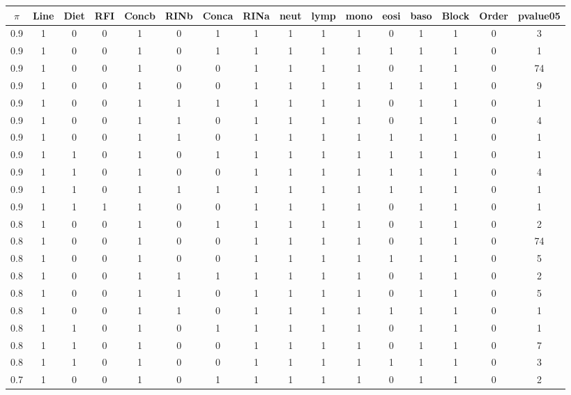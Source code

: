 \documentclass[12pt, letter]{article}\usepackage[]{graphicx}\usepackage[]{color}
\begin{document}
\begin{table}
\centering
{\scriptsize
\begin{tabular}{|c|c|c|c|c|c|c|c|c|c|c|c|c|c|c|c|}
  \hline
$\pi$ & Line & Diet & RFI & Concb & RINb & Conca & RINa & neut & lymp & mono & eosi & baso & Block & Order & pvalue05 \\ 
  \hline
0.9 & 1 & 0 & 0 & 1 & 0 & 1 & 1 & 1 & 1 & 1 & 0 & 1 & 1 & 0 & 3 \\ 
  0.9 & 1 & 0 & 0 & 1 & 0 & 1 & 1 & 1 & 1 & 1 & 1 & 1 & 1 & 0 & 1 \\ 
  0.9 & 1 & 0 & 0 & 1 & 0 & 0 & 1 & 1 & 1 & 1 & 0 & 1 & 1 & 0 & 74 \\ 
  0.9 & 1 & 0 & 0 & 1 & 0 & 0 & 1 & 1 & 1 & 1 & 1 & 1 & 1 & 0 & 9 \\ 
  0.9 & 1 & 0 & 0 & 1 & 1 & 1 & 1 & 1 & 1 & 1 & 0 & 1 & 1 & 0 & 1 \\ 
  0.9 & 1 & 0 & 0 & 1 & 1 & 0 & 1 & 1 & 1 & 1 & 0 & 1 & 1 & 0 & 4 \\ 
  0.9 & 1 & 0 & 0 & 1 & 1 & 0 & 1 & 1 & 1 & 1 & 1 & 1 & 1 & 0 & 1 \\ 
  0.9 & 1 & 1 & 0 & 1 & 0 & 1 & 1 & 1 & 1 & 1 & 1 & 1 & 1 & 0 & 1 \\ 
  0.9 & 1 & 1 & 0 & 1 & 0 & 0 & 1 & 1 & 1 & 1 & 1 & 1 & 1 & 0 & 4 \\ 
  0.9 & 1 & 1 & 0 & 1 & 1 & 1 & 1 & 1 & 1 & 1 & 1 & 1 & 1 & 0 & 1 \\ 
  0.9 & 1 & 1 & 1 & 1 & 0 & 0 & 1 & 1 & 1 & 1 & 0 & 1 & 1 & 0 & 1 \\ 
   \hline
0.8 & 1 & 0 & 0 & 1 & 0 & 1 & 1 & 1 & 1 & 1 & 0 & 1 & 1 & 0 & 2 \\ 
  0.8 & 1 & 0 & 0 & 1 & 0 & 0 & 1 & 1 & 1 & 1 & 0 & 1 & 1 & 0 & 74 \\ 
  0.8 & 1 & 0 & 0 & 1 & 0 & 0 & 1 & 1 & 1 & 1 & 1 & 1 & 1 & 0 & 5 \\ 
  0.8 & 1 & 0 & 0 & 1 & 1 & 1 & 1 & 1 & 1 & 1 & 0 & 1 & 1 & 0 & 2 \\ 
  0.8 & 1 & 0 & 0 & 1 & 1 & 0 & 1 & 1 & 1 & 1 & 0 & 1 & 1 & 0 & 5 \\ 
  0.8 & 1 & 0 & 0 & 1 & 1 & 0 & 1 & 1 & 1 & 1 & 1 & 1 & 1 & 0 & 1 \\ 
  0.8 & 1 & 1 & 0 & 1 & 0 & 1 & 1 & 1 & 1 & 1 & 0 & 1 & 1 & 0 & 1 \\ 
  0.8 & 1 & 1 & 0 & 1 & 0 & 0 & 1 & 1 & 1 & 1 & 0 & 1 & 1 & 0 & 7 \\ 
  0.8 & 1 & 1 & 0 & 1 & 0 & 0 & 1 & 1 & 1 & 1 & 1 & 1 & 1 & 0 & 3 \\ 
   \hline
0.7 & 1 & 0 & 0 & 1 & 0 & 1 & 1 & 1 & 1 & 1 & 0 & 1 & 1 & 0 & 2 \\ 

\end{tabular}}
\end{table}
\end{document}

